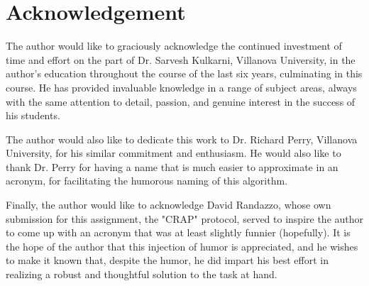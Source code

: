 \section*{Acknowledgement}
The author would like to graciously acknowledge the continued investment of time and effort on the part of Dr. Sarvesh Kulkarni, Villanova University, in the author's education throughout the course of the last six years, culminating in this course. He has provided invaluable knowledge in a range of subject areas, always with the same attention to detail, passion, and genuine interest in the success of his students. 

The author would also like to dedicate this work to Dr. Richard Perry, Villanova University, for his similar commitment and enthusiasm. He would also like to thank Dr. Perry for having a name that is much easier to approximate in an acronym, for facilitating the humorous naming of this algorithm. 

Finally, the author would like to acknowledge David Randazzo, whose own submission for this assignment, the "CRAP" protocol, served to inspire the author to come up with an acronym that was at least slightly funnier (hopefully). It is the hope of the author that this injection of humor is appreciated, and he wishes to make it known that, despite the humor, he did impart his best effort in realizing a robust and thoughtful solution to the task at hand.
